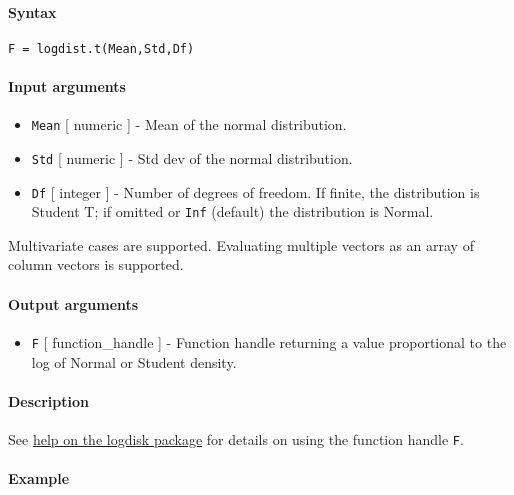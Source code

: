 


	\paragraph{Syntax}

\begin{verbatim}
F = logdist.t(Mean,Std,Df)
\end{verbatim}

\paragraph{Input arguments}

\begin{itemize}
\item
  \texttt{Mean} {[} numeric {]} - Mean of the normal distribution.
\item
  \texttt{Std} {[} numeric {]} - Std dev of the normal distribution.
\item
  \texttt{Df} {[} integer {]} - Number of degrees of freedom. If finite,
  the distribution is Student T; if omitted or \texttt{Inf} (default)
  the distribution is Normal.
\end{itemize}

Multivariate cases are supported. Evaluating multiple vectors as an
array of column vectors is supported.

\paragraph{Output arguments}

\begin{itemize}
\itemsep1pt\parskip0pt
\item
  \texttt{F} {[} function\_handle {]} - Function handle returning a
  value proportional to the log of Normal or Student density.
\end{itemize}

\paragraph{Description}

See \href{logdist/Contents}{help on the logdisk package} for details on
using the function handle \texttt{F}.

\paragraph{Example}


